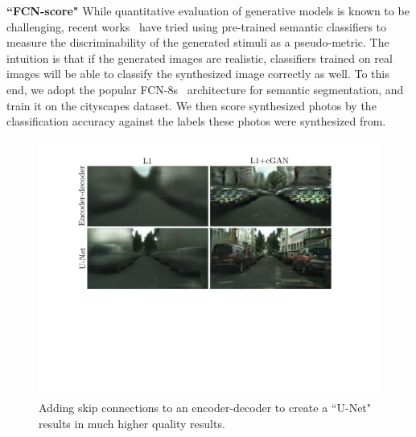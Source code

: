 \documentclass[10pt,twocolumn,letterpaper]{article}
\begin{document}
{\bf ``FCN-score"} While quantitative evaluation of generative models is known to be challenging, recent works~\cite{salimans2016improved, wang2016generative, zhang2016colorful,owens2016visually} have tried using pre-trained semantic classifiers to measure the discriminability of the generated stimuli as a pseudo-metric. The intuition is that if the generated images are realistic, classifiers trained on real images will be able to classify the synthesized image correctly as well. To this end, we adopt the popular FCN-8s~\cite{long2015fully} architecture for semantic segmentation, and train it on the cityscapes dataset. We then score synthesized photos by the classification accuracy against the labels these photos were synthesized from.





\begin{figure}
 \centering
 \includegraphics[width=1.0\hsize]{figs/enc_dec_vs_unet_v3.pdf}
 \vspace{-0.2in}
  \caption{Adding skip connections to an encoder-decoder to create a ``U-Net" results in much higher quality results.}%
 \label{enc_dec_vs_unet}
 \vspace{-0.2in}
\end{figure}


%
\end{document}
